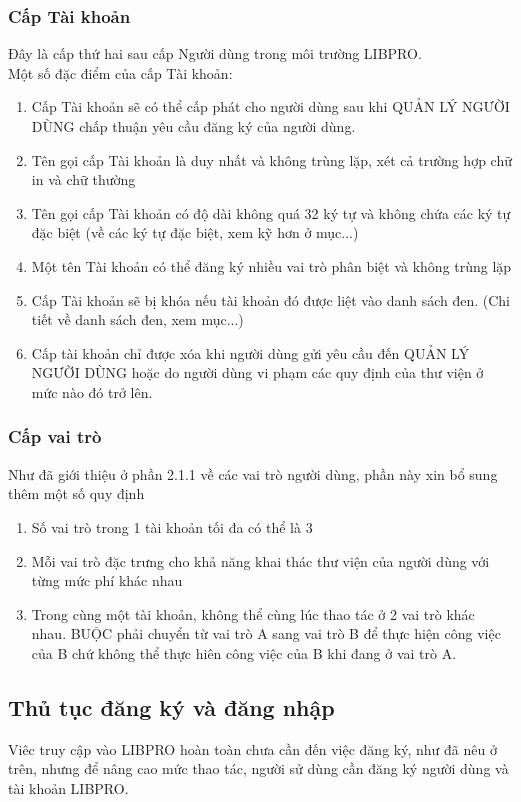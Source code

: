 \documentclass[12pt,a4paper]{report}
\begin{document}
			\subsubsection{Cấp Tài khoản}
			Đây là cấp thứ hai sau cấp Người dùng trong môi trường LIBPRO.\\
			Một số đặc điểm của cấp Tài khoản:
			\begin{enumerate}
				\item Cấp Tài khoản sẽ có thể cấp phát cho người dùng sau khi QUẢN LÝ NGƯỜI DÙNG chấp thuận yêu cầu đăng ký của người dùng.
				\item Tên gọi cấp Tài khoản là duy nhất và không trùng lặp, xét cả trường hợp chữ in và chữ thường
				\item Tên gọi cấp Tài khoản có độ dài không quá 32 ký tự và không chứa các ký tự đặc biệt (về các ký tự đặc biệt, xem kỹ hơn ở mục...)
				\item Một tên Tài khoản có thể đăng ký nhiều vai trò phân biệt và không trùng lặp
				\item Cấp Tài khoản sẽ bị khóa nếu tài khoản đó được liệt vào danh sách đen. (Chi tiết về danh sách đen, xem mục...)
				\item Cấp tài khoản chỉ được xóa khi người dùng gửi yêu cầu đến QUẢN LÝ NGƯỜI DÙNG hoặc do người dùng vi phạm các quy định của thư viện ở mức nào đó trở lên.
			\end{enumerate}
			\subsubsection{Cấp vai trò}
			Như đã giới thiệu ở phần 2.1.1 về các vai trò người dùng, phần này xin bổ sung thêm một số quy định
			\begin{enumerate}
				\item Số vai trò trong 1 tài khoản tối đa có thể là 3
				\item Mỗi vai trò đặc trưng cho khả năng khai thác thư viện của người dùng với từng mức phí khác nhau
				\item Trong cùng một tài khoản, không thể cùng lúc thao tác ở 2 vai trò khác nhau. BUỘC phải chuyển từ vai trò A sang vai trò B để thực hiện công việc của B chứ không thể thực hiên công việc của B khi đang ở vai trò A.
			\end{enumerate}
		\subsection{Thủ tục đăng ký và đăng nhập}
		Viêc truy cập vào LIBPRO hoàn toàn chưa cần đến việc đăng ký, như đã nêu ở trên, nhưng để nâng cao mức thao tác, người sử dùng cần đăng ký người dùng và tài khoản LIBPRO.\\
\end{document}
